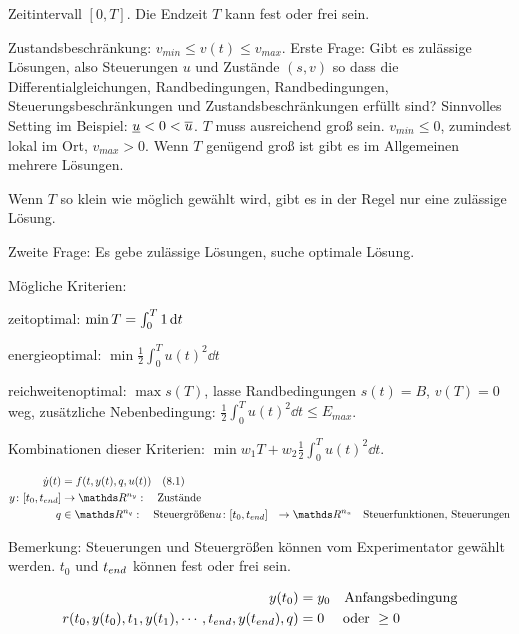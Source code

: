 Zeitintervall $[0,T]$. Die Endzeit $T$ kann fest oder frei sein.

Zustandsbeschränkung: $v_{min} \leq v(t) \leq v_{max}$. Erste Frage: Gibt es zulässige Lösungen, also Steuerungen $u$ und Zustände $(s,v)$ so dass die Differentialgleichungen, Randbedingungen, Randbedingungen, Steuerungsbeschränkungen und Zustandsbeschränkungen erfüllt sind? Sinnvolles Setting im Beispiel: $\underline u < 0 < \overline u$. $T$ muss ausreichend groß sein. $v_{min} \leq 0$, zumindest lokal im Ort, $v_{max} > 0$. Wenn $T$ genügend groß ist gibt es im Allgemeinen mehrere Lösungen.

Wenn $T$ so klein wie möglich gewählt wird, gibt es in der Regel nur eine zulässige Lösung.

Zweite Frage: Es gebe zulässige Lösungen, suche optimale Lösung.

Mögliche Kriterien:

\bitm
\item zeitoptimal: $\min T = \int_0^T 1 \,\mathrm dt$
\item energieoptimal: $\min \frac 12 \int_0^T u(t)^2 \dd t$ 
\item reichweitenoptimal: $\max s(T)$, lasse Randbedingungen $s(t)=B$, $v(T) = 0$ weg, zusätzliche Nebenbedingung: $\frac 12 \int_0^T u(t)^2 \dd t \leq E_{max}$.
\item Kombinationen dieser Kriterien: $\min w_1 T + w_2 \frac 12 \int_0^T u(t)^2 \dd t$.
\eitm



\begin{align*}
\dot y(t) &= f(t,y(t),q,u(t)) \quad (8.1) \\
y\colon [t_0, \tend] &\to \R^{n_y}: \quad \text{Zustände} \\
q & \in \R^{n_q}: \quad \text{Steuergrößen}
u\colon [t_0, \tend] &\to \R^{n_u} \quad \text{Steuerfunktionen, Steuerungen} \\ 
\end{align*}

Bemerkung: Steuerungen und Steuergrößen können vom Experimentator gewählt werden. $t_0$ und ${t_{end}}$ können fest oder frei sein.


\begin{align*}
y(t_0) &= y_0 \quad \text{Anfangsbedingung} \\
r(t_0, y(t_0), t_1, y(t_1), \cdots, {t_{end}}, y({t_{end}}), q) &= 0 \quad \text{ oder } \geq 0 \\
\end{align*}


